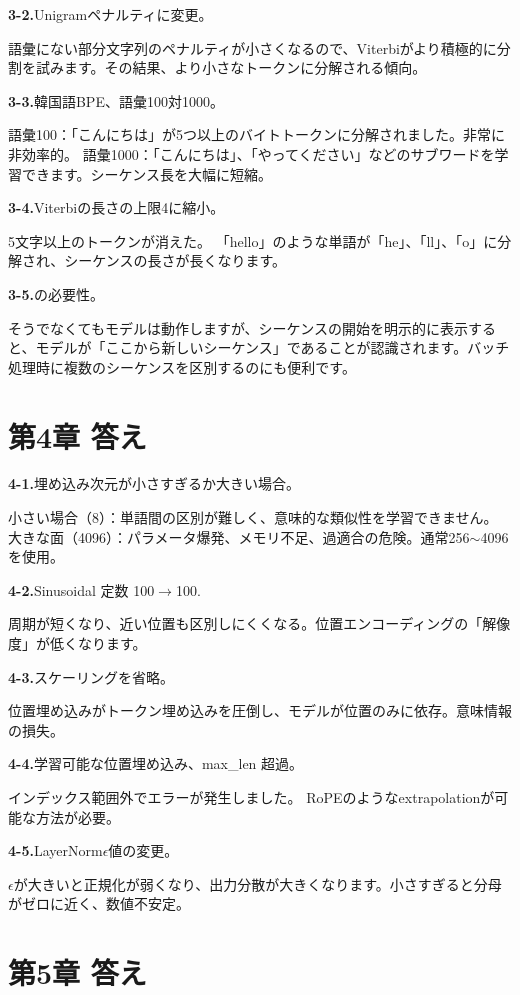\textbf{3-2.}Unigramペナルティに変更。

語彙にない部分文字列のペナルティが小さくなるので、Viterbiがより積極的に分割を試みます。その結果、より小さなトークンに分解される傾向。

\textbf{3-3.}韓国語BPE、語彙100対1000。

語彙100：「こんにちは」が5つ以上のバイトトークンに分解されました。非常に非効率的。
語彙1000：「こんにちは」、「やってください」などのサブワードを学習できます。シーケンス長を大幅に短縮。

\textbf{3-4.}Viterbiの長さの上限4に縮小。

5文字以上のトークンが消えた。 「hello」のような単語が「he」、「ll」、「o」に分解され、シーケンスの長さが長くなります。

\textbf{3-5.}の必要性。

そうでなくてもモデルは動作しますが、シーケンスの開始を明示的に表示すると、モデルが「ここから新しいシーケンス」であることが認識されます。バッチ処理時に複数のシーケンスを区別するのにも便利です。

\section{第4章 答え}

\textbf{4-1.}埋め込み次元が小さすぎるか大きい場合。

小さい場合（8）：単語間の区別が難しく、意味的な類似性を学習できません。
大きな面（4096）：パラメータ爆発、メモリ不足、過適合の危険。通常256$\sim$4096を使用。

\textbf{4-2.}Sinusoidal 定数 100$\to$100.

周期が短くなり、近い位置も区別しにくくなる。位置エンコーディングの「解像度」が低くなります。

\textbf{4-3.}スケーリングを省略。

位置埋め込みがトークン埋め込みを圧倒し、モデルが位置のみに依存。意味情報の損失。

\textbf{4-4.}学習可能な位置埋め込み、max\_len 超過。

インデックス範囲外でエラーが発生しました。 RoPEのようなextrapolationが可能な方法が必要。

\textbf{4-5.}LayerNorm$\epsilon$値の変更。

$\epsilon$が大きいと正規化が弱くなり、出力分散が大きくなります。小さすぎると分母がゼロに近く、数値不安定。

\section{第5章 答え}

